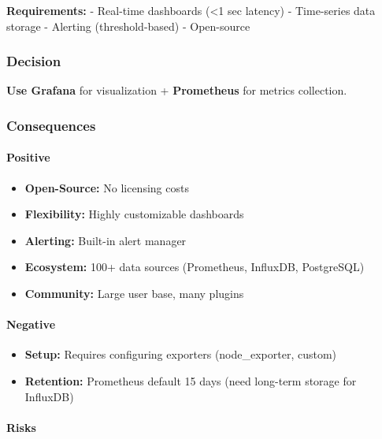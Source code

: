 \documentclass[
]{article}
\providecommand{\tightlist}{%
  \setlength{\itemsep}{0pt}\setlength{\parskip}{0pt}}
\begin{document}
\textbf{Requirements:} - Real-time dashboards (\textless1 sec latency) -
Time-series data storage - Alerting (threshold-based) - Open-source

\hypertarget{decision-10}{%
\subsubsection{Decision}\label{decision-10}}

\textbf{Use Grafana} for visualization + \textbf{Prometheus} for metrics
collection.

\hypertarget{consequences-10}{%
\subsubsection{Consequences}\label{consequences-10}}

\hypertarget{positive-10}{%
\paragraph{Positive}\label{positive-10}}

\begin{itemize}
\tightlist
\item
  \textbf{Open-Source:} No licensing costs
\item
  \textbf{Flexibility:} Highly customizable dashboards
\item
  \textbf{Alerting:} Built-in alert manager
\item
  \textbf{Ecosystem:} 100+ data sources (Prometheus, InfluxDB,
  PostgreSQL)
\item
  \textbf{Community:} Large user base, many plugins
\end{itemize}

\hypertarget{negative-10}{%
\paragraph{Negative}\label{negative-10}}

\begin{itemize}
\tightlist
\item
  \textbf{Setup:} Requires configuring exporters (node\_exporter,
  custom)
\item
  \textbf{Retention:} Prometheus default 15 days (need long-term storage
  for InfluxDB)
\end{itemize}

\hypertarget{risks-10}{%
\paragraph{Risks}\label{risks-10}}
\end{document}
